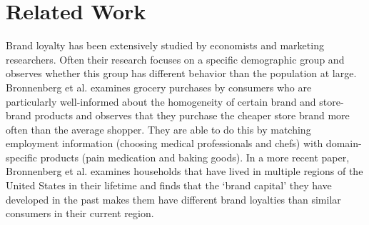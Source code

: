 \documentclass[conference]{IEEEtran}
\begin{document}
%




\section{Related Work}
Brand loyalty has been extensively studied by economists and marketing researchers. Often their research focuses on a specific demographic group and observes whether this group has different behavior than the population at large. Bronnenberg et al. examines grocery purchases by consumers who are particularly well-informed about the homogeneity of certain brand and store-brand products and observes that they purchase the cheaper store brand more often than the average shopper. They are able to do this by matching employment information (choosing medical professionals and chefs) with domain-specific products (pain medication and baking goods). In a more recent paper, Bronnenberg et al. examines households that have lived in multiple regions of the United States in their lifetime and finds that the ‘brand capital’ they have developed in the past makes them have different brand loyalties than similar consumers in their current region.
\end{document}
